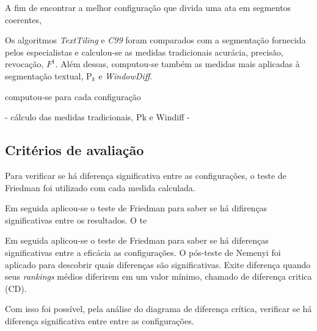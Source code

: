 A fim de encontrar a melhor configuração que divida uma ata em segmentos coerentes, 

Os algoritmos \textit{TextTiling} e \textit{C99} foram comparados com a segmentação fornecida pelos especialistas e calculou-se as medidas tradicionais acurácia, precisão, revocação, $F^1$. Além dessas, computou-se também as medidas mais aplicadas à segmentação textual, P$_k$ e \textit{WindowDiff}.


computou-se para cada configuração 


- cálculo das medidas tradicionais, Pk e Windiff
- 









\subsection{Critérios de avaliação}


Para verificar se há diferença significativa entre as configurações, o teste de Friedman foi utilizado com cada medida calculada. 





Em seguida aplicou-se o teste de Friedman para saber se há difirenças significativas entre os resultados. O te

Em seguida aplicou-se o teste de Friedman para saber se há diferenças significativas entre a eficácia as configurações. O pós-teste de Nemenyi foi aplicado para descobrir quais diferenças são significativas. 
%
Exite diferença quando seus \textit{rankings} médios diferirem em um valor mínimo, chamado de diferença critica (CD). 
%

Com isso foi possível, pela análise do diagrama de diferença crítica, verificar 
se há diferença significativa entre entre as configurações.


